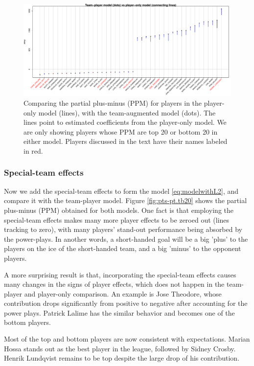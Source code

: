 \begin{figure}[htb!]
    \centering
    \includegraphics[width=\textwidth]{figures/ptvsp_tb20.pdf}
    \caption{Comparing the partial plus-minus (PPM) for players in the player-only model (lines), with the team-augmented model (dots). The lines point to estimated coefficients from the player-only model. We are only showing players whose PPM are top 20 or bottom 20 in either model. Players discussed in the text have their names labeled in red.}\label{fig:pt-p.tb20}
\end{figure}

\subsubsection{Special-team effects}
Now we add the special-team effects to form the model \eqref{eq:modelwithL2}, and compare it with the team-player model. Figure \ref{fig:pts-pt.tb20} shows the partial plus-minus (PPM) obtained for both models. One fact is that employing the special-team effects makes many more player effects to be zeroed out (lines tracking to zero), with many players' stand-out performance being absorbed by the power-plays. In another words, a short-handed goal will be a big 'plus' to the players on the ice of the short-handed team, and a big 'minus' to the opponent players. 

A more surprising result is that, incorporating the special-team effects causes many changes in the signs of player effects, which does not happen in the team-player and player-only comparison. An example is Jose Theodore, whose contribution drops significantly from positive to negative after accounting for the power plays. Patrick Lalime has the similar behavior and becomes one of the bottom players.

Most of the top and bottom players are now consistent with expectations. Marian Hossa stands out as the best player in the league, followed by Sidney Crosby. Henrik Lundqvist remains to be top despite the large drop of his contribution. 

